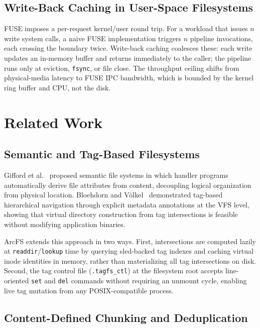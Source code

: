 \documentclass[5p,times]{elsarticle}
\begin{document}
\subsection{Write-Back Caching in User-Space Filesystems}

FUSE imposes a per-request kernel/user round trip.  For a workload that
issues $n$ write system calls, a naive FUSE implementation triggers $n$
pipeline invocations, each crossing the boundary twice.  Write-back
caching coalesces these: each write updates an in-memory buffer and
returns immediately to the caller; the pipeline runs only at eviction,
\texttt{fsync}, or file close.  The throughput ceiling shifts from
physical-media latency to FUSE IPC bandwidth, which is bounded by the
kernel ring buffer and CPU, not the disk.

\section{Related Work}

\subsection{Semantic and Tag-Based Filesystems}

Gifford et al.~\cite{gifford1991semantic} proposed semantic file systems
in which handler programs automatically derive file attributes from content,
decoupling logical organization from physical location. Bloehdorn and
V\"{o}lkel~\cite{bloehdorn2006tagfs} demonstrated tag-based hierarchical
navigation through explicit metadata annotations at the VFS level, showing
that virtual directory construction from tag intersections is feasible
without modifying application binaries.

ArcFS extends this approach in two ways. First, intersections are computed
lazily at \texttt{readdir}/\texttt{lookup} time by querying sled-backed tag
indexes and caching virtual inode identities in memory, rather than
materializing all tag intersections on disk.  Second, the tag control file
(\texttt{.tagfs\_ctl}) at the filesystem root accepts line-oriented
\texttt{set} and \texttt{del} commands without requiring an unmount cycle,
enabling live tag mutation from any POSIX-compatible process.

\subsection{Content-Defined Chunking and Deduplication}
\end{document}
